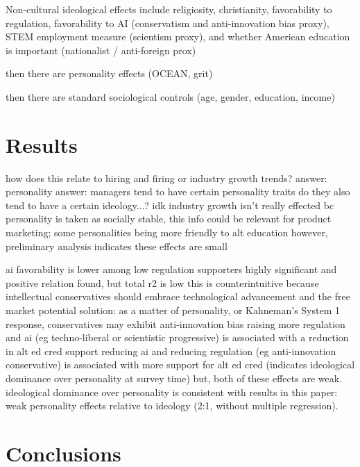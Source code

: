 \documentclass[review]{elsarticle}
\begin{document}
Non-cultural ideological effects include religiosity,
christianity,
favorability to regulation,
favorability to AI (conservatism and anti-innovation bias proxy),
STEM employment measure (scientism proxy),
and whether American education is important (nationalist / anti-foreign prox)

then there are personality effects (OCEAN, grit)

then there are standard sociological controls (age, gender, education, income)

\section{Results}


how does this relate to hiring and firing or industry growth trends?
answer: personality answer: managers tend to have certain personality traits
do they also tend to have a certain ideology...? idk
industry growth isn't really effected bc personality is taken as socially stable,
this info could be relevant for product marketing; some personalities being more friendly to alt education
however, preliminary analysis indicates these effects are small

%

ai favorability is lower among low regulation supporters
highly significant and positive relation found, but total r2 is low
this is counterintuitive because intellectual conservatives should embrace technological advancement and the free market
potential solution: as a matter of personality, or Kahneman's System 1 response, conservatives may exhibit anti-innovation bias
raising more regulation and ai (eg techno-liberal or scientistic progressive) is associated with a reduction in alt ed cred support
reducing ai and reducing regulation (eg anti-innovation conservative) is associated with more support for alt ed cred (indicates ideological dominance over personality at survey time)
but, both of these effects are weak.
ideological dominance over personality is consistent with results in this paper: weak personality effects relative to ideology (2:1, without multiple regression).


\section{Conclusions}
\end{document}
